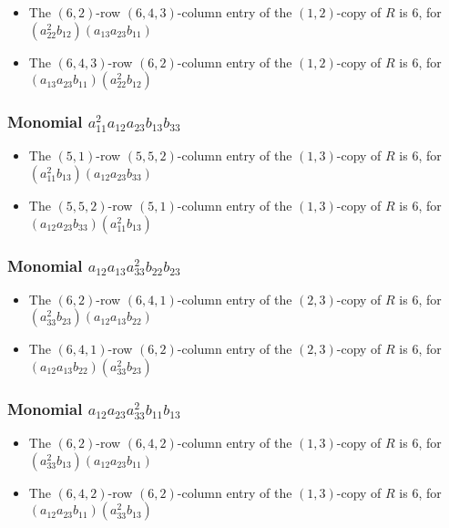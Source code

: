 \documentclass{article}
\begin{document}
\begin{itemize}
\item The $(6, 2)$-row $(6, 4, 3)$-column entry of the $ \left(1, 2\right) $-copy of $R$ is $ 6 $, for $( a_{22}^{2} b_{12} )( a_{13} a_{23} b_{11} )$ 
\item The $(6, 4, 3)$-row $(6, 2)$-column entry of the $ \left(1, 2\right) $-copy of $R$ is $ 6 $, for $( a_{13} a_{23} b_{11} )( a_{22}^{2} b_{12} )$ 
\end{itemize}
\subsubsection{Monomial $ a_{11}^{2} a_{12} a_{23} b_{13} b_{33} $}

\begin{itemize}
\item The $(5, 1)$-row $(5, 5, 2)$-column entry of the $ \left(1, 3\right) $-copy of $R$ is $ 6 $, for $( a_{11}^{2} b_{13} )( a_{12} a_{23} b_{33} )$ 
\item The $(5, 5, 2)$-row $(5, 1)$-column entry of the $ \left(1, 3\right) $-copy of $R$ is $ 6 $, for $( a_{12} a_{23} b_{33} )( a_{11}^{2} b_{13} )$ 
\end{itemize}
\subsubsection{Monomial $ a_{12} a_{13} a_{33}^{2} b_{22} b_{23} $}

\begin{itemize}
\item The $(6, 2)$-row $(6, 4, 1)$-column entry of the $ \left(2, 3\right) $-copy of $R$ is $ 6 $, for $( a_{33}^{2} b_{23} )( a_{12} a_{13} b_{22} )$ 
\item The $(6, 4, 1)$-row $(6, 2)$-column entry of the $ \left(2, 3\right) $-copy of $R$ is $ 6 $, for $( a_{12} a_{13} b_{22} )( a_{33}^{2} b_{23} )$ 
\end{itemize}
\subsubsection{Monomial $ a_{12} a_{23} a_{33}^{2} b_{11} b_{13} $}

\begin{itemize}
\item The $(6, 2)$-row $(6, 4, 2)$-column entry of the $ \left(1, 3\right) $-copy of $R$ is $ 6 $, for $( a_{33}^{2} b_{13} )( a_{12} a_{23} b_{11} )$ 
\item The $(6, 4, 2)$-row $(6, 2)$-column entry of the $ \left(1, 3\right) $-copy of $R$ is $ 6 $, for $( a_{12} a_{23} b_{11} )( a_{33}^{2} b_{13} )$ 
\end{itemize}
\end{document}
